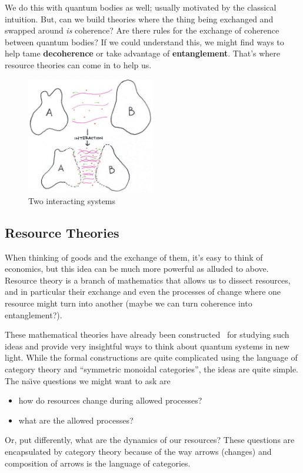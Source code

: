 \documentclass[11pt,english]{article}
\theoremstyle{definition}
\begin{document}
We do this with quantum bodies as well; usually motivated by the classical intuition. But, can we build theories where the thing being exchanged and swapped around \emph{is} coherence? Are there rules for the exchange of coherence between quantum bodies? If we could understand this, we might find ways to help tame \textbf{decoherence} or take advantage of \textbf{entanglement}. That's where resource theories can come in to help us.

\begin{figure}[h!]
	\begin{center}
		\includegraphics[width=0.5\textwidth]{interaction.jpeg}
		\caption{Two interacting systems}\label{fig:interacting-systems}
	\end{center}
\end{figure}


\subsection{Resource Theories}
When thinking of goods and the exchange of them, it's easy to think of economics, but this idea can be much more powerful as alluded to above. Resource theory is a branch of mathematics that allows us to dissect resources, and in particular their exchange and even the processes of change where one resource might turn into another (maybe we can turn coherence into entanglement?).

These mathematical theories have already been constructed~\cite{mathematical-resources,resource-theory} for studying such ideas and provide very insightful ways to think about quantum systems in new light. While the formal constructions are quite complicated using the language of category theory and ``symmetric monoidal categories'', the ideas are quite simple. The na\"\i ve questions we might want to ask are
\begin{itemize}
	\item how do resources change during allowed processes?
	\item what are the allowed processes?
\end{itemize}
Or, put differently, what are the dynamics of our resources? These questions are encapsulated by category theory because of the way arrows (changes) and composition of arrows is the language of categories.
\end{document}
